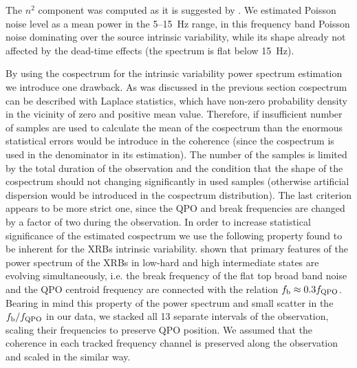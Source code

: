 \documentclass[a4paper,fleqn,usenatbib]{mnras}
\begin{document}
The $n^2$ component was computed as it is suggested by . 
We estimated Poisson noise level as a mean power in the 5--15~Hz range, in this frequency band Poisson noise dominating over the source intrinsic variability, while its shape already not affected by the dead-time effects (the spectrum is flat below 15~Hz).

By using the cospectrum for the intrinsic variability power spectrum estimation we introduce one drawback. 
As was discussed in the previous section cospectrum can be described with Laplace statistics, which have non-zero probability density in the vicinity of zero and positive mean value.
Therefore, if insufficient number of samples are used to calculate the mean of the cospectrum than the enormous statistical errors would be introduce in the coherence (since the cospectrum is used in the denominator in its estimation).
The number of the samples is limited by the total duration of the observation and the condition that the shape of the cospectrum should not changing significantly in used samples (otherwise artificial dispersion would be introduced in the cospectrum distribution).
The last criterion appears to be more strict one, since the QPO and break frequencies are changed by a factor of two during the observation.
In order to increase statistical significance of the estimated cospectrum we use the following property found to be inherent for the XRBs intrinsic variability. 
\citet{wijnands99} shown that primary features of the power spectrum of the XRBs in low-hard and high intermediate states are evolving simultaneously, i.e. the break frequency of the flat top broad band noise and the QPO centroid frequency are connected with the relation $f_{\rm b} \approx 0.3 f_{\rm QPO}$.
Bearing in mind this property of the power spectrum and small scatter in the $f_{\rm b}/f_{\rm QPO}$ in our data, we stacked all 13 separate intervals of the observation, scaling their frequencies to preserve QPO position. 
We assumed that the coherence in each tracked frequency channel is preserved along the observation and scaled in the similar way.
\end{document}
